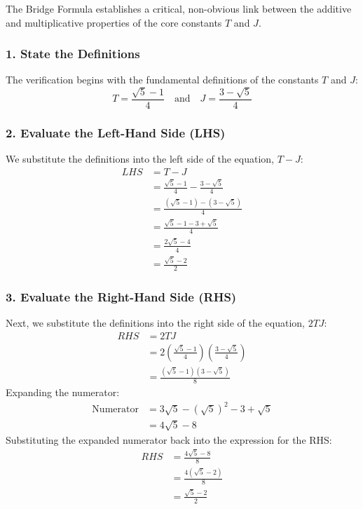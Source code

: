 The Bridge Formula establishes a critical, non-obvious link between the additive and multiplicative properties of the core constants $T$ and $J$.

\subsubsection*{1. State the Definitions}
The verification begins with the fundamental definitions of the constants $T$ and $J$:
$$ T = \frac{\sqrt{5}-1}{4} \quad \text{and} \quad J = \frac{3-\sqrt{5}}{4} $$

\subsubsection*{2. Evaluate the Left-Hand Side (LHS)}
We substitute the definitions into the left side of the equation, $T-J$:
\begin{align*}
LHS &= T - J \\
&= \frac{\sqrt{5}-1}{4} - \frac{3-\sqrt{5}}{4} \\
&= \frac{(\sqrt{5}-1) - (3-\sqrt{5})}{4} \\
&= \frac{\sqrt{5}-1-3+\sqrt{5}}{4} \\
&= \frac{2\sqrt{5}-4}{4} \\
&= \frac{\sqrt{5}-2}{2}
\end{align*}

\subsubsection*{3. Evaluate the Right-Hand Side (RHS)}
Next, we substitute the definitions into the right side of the equation, $2TJ$:
\begin{align*}
RHS &= 2TJ \\
&= 2 \left( \frac{\sqrt{5}-1}{4} \right) \left( \frac{3-\sqrt{5}}{4} \right) \\
&= \frac{(\sqrt{5}-1)(3-\sqrt{5})}{8}
\end{align*}
Expanding the numerator:
\begin{align*}
\text{Numerator} &= 3\sqrt{5} - (\sqrt{5})^2 - 3 + \sqrt{5} \\
&= 4\sqrt{5} - 8
\end{align*}
Substituting the expanded numerator back into the expression for the RHS:
\begin{align*}
RHS &= \frac{4\sqrt{5} - 8}{8} \\
&= \frac{4(\sqrt{5}-2)}{8} \\
&= \frac{\sqrt{5}-2}{2}
\end{align*}

